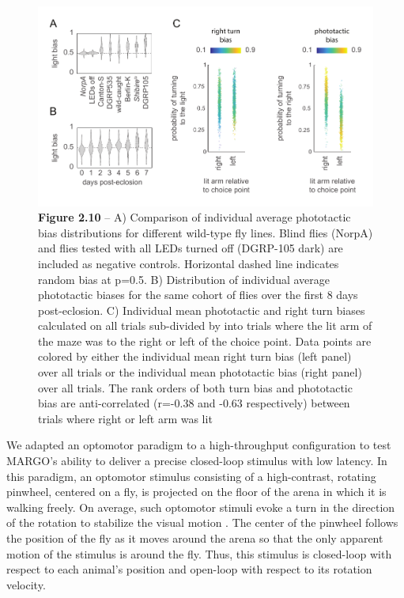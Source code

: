 \documentclass[12pt,letterpaper]{article}
\begin{document}
\begin{figure}[t!]
 \includegraphics[width=\textwidth]{../figures/chapter_2/fig_2-10.pdf}
 \vspace{.1in}
 \caption*{\textbf{Figure 2.10} -- A) Comparison of individual average phototactic bias distributions for different wild-type fly lines. Blind flies (NorpA) and flies tested with all LEDs turned off (DGRP-105 dark) are included as negative controls. Horizontal dashed line indicates random bias at p=0.5. B) Distribution of individual average phototactic biases for the same cohort of flies over the first 8 days post-eclosion. C) Individual mean phototactic and right turn biases calculated on all trials sub-divided by into trials where the lit arm of the maze was to the right or left of the choice point. Data points are colored by either the individual mean right turn bias (left panel) over all trials or the individual mean phototactic bias (right panel) over all trials. The rank orders of both turn bias and phototactic bias are anti-correlated (r=-0.38 and -0.63 respectively) between trials where right or left arm was lit}
\end{figure}

We adapted an optomotor paradigm \cite{Cruz572792} to a high-throughput configuration to test MARGO's ability to deliver a precise closed-loop stimulus with low latency. In this paradigm, an optomotor stimulus consisting of a high-contrast, rotating pinwheel, centered on a fly, is projected on the floor of the arena in which it is walking freely. On average, such optomotor stimuli evoke a turn in the direction of the rotation to stabilize the visual motion \cite{Gtz_Visual_1973}. The center of the pinwheel follows the position of the fly as it moves around the arena so that the only apparent motion of the stimulus is around the fly. Thus, this stimulus is closed-loop with respect to each animal's position and open-loop with respect to its rotation velocity.
\end{document}
